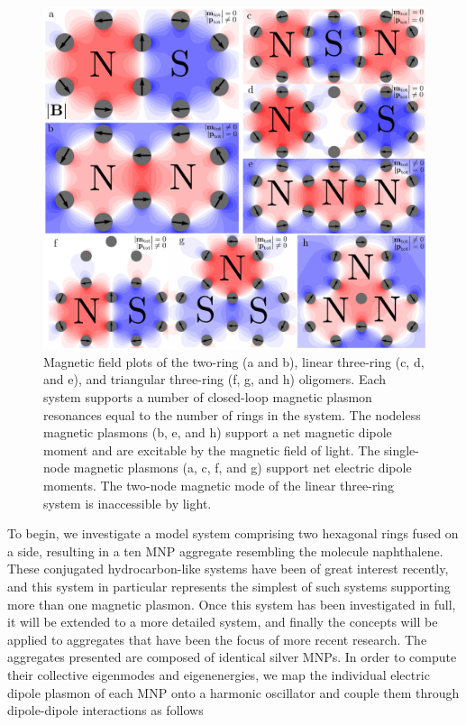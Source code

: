 \documentclass[journal=apchd5,manuscript=article]{achemso}
\begin{document}
\begin{figure}
\includegraphics[width=6.5in]{fields_new_arrows.pdf}
\caption{Magnetic field plots of the two-ring (a and b), linear three-ring (c, d, and e), and triangular three-ring (f, g, and h) oligomers. Each system supports a number of closed-loop magnetic plasmon resonances equal to the number of rings in the system. The nodeless magnetic plasmons (b, e, and h) support a net magnetic dipole moment and are excitable by the magnetic field of light. The single-node magnetic plasmons (a, c, f, and g) support net electric dipole moments. The two-node magnetic mode of the linear three-ring system is inaccessible by light.}
\label{field_plots}
\end{figure}

To begin, we investigate a model system comprising two hexagonal rings fused on a side, resulting in a ten MNP aggregate resembling the molecule naphthalene. These conjugated hydrocarbon-like systems have been of great interest recently, and this system in particular represents the simplest of such systems supporting more than one magnetic plasmon. Once this system has been investigated in full, it will be extended to a more detailed system, and finally the concepts will be applied to aggregates that have been the focus of more recent research. The aggregates presented are composed of identical silver MNPs. In order to compute their collective eigenmodes and eigenenergies, we map the individual electric dipole plasmon of each MNP onto a harmonic oscillator and couple them through dipole-dipole interactions as follows\cite{ARPC}
\end{document}
